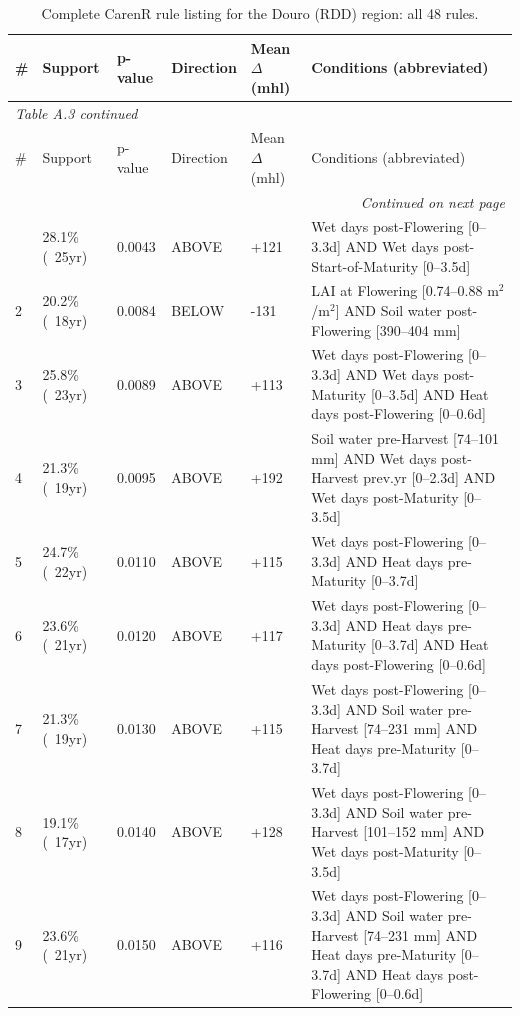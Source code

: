 {\footnotesize
\begin{longtable}{p{0.4cm}|p{1.5cm}|p{1.2cm}|p{1.3cm}|p{1.5cm}|p{8.2cm}}
  \caption{Complete CarenR rule listing for the Douro (RDD) region: all 48 rules.}\label{tab:appa_1}\\
  \toprule
  \# & Support & p-value & Direction & Mean $\Delta$ (mhl) & Conditions (abbreviated) \\
  \midrule
  \endfirsthead
  \multicolumn{6}{l}{\small\textit{Table A.3 continued}}\\
  \toprule
  \# & Support & p-value & Direction & Mean $\Delta$ (mhl) & Conditions (abbreviated) \\
  \midrule
  \endhead
  \midrule
  \multicolumn{6}{r}{\small\textit{Continued on next page}}\\
  \endfoot
  \bottomrule
  \endlastfoot
  1 & 28.1\% (~25yr) & 0.0043 & ABOVE & +121 & Wet days post-Flowering [0--3.3d] AND Wet days post-Start-of-Maturity [0--3.5d] \\
  2 & 20.2\% (~18yr) & 0.0084 & BELOW & -131 & LAI at Flowering [0.74--0.88 m$^2$/m$^2$] AND Soil water post-Flowering [390--404 mm] \\
  3 & 25.8\% (~23yr) & 0.0089 & ABOVE & +113 & Wet days post-Flowering [0--3.3d] AND Wet days post-Maturity [0--3.5d] AND Heat days post-Flowering [0--0.6d] \\
  4 & 21.3\% (~19yr) & 0.0095 & ABOVE & +192 & Soil water pre-Harvest [74--101 mm] AND Wet days post-Harvest prev.yr [0--2.3d] AND Wet days post-Maturity [0--3.5d] \\
  5 & 24.7\% (~22yr) & 0.0110 & ABOVE & +115 & Wet days post-Flowering [0--3.3d] AND Heat days pre-Maturity [0--3.7d] \\
  6 & 23.6\% (~21yr) & 0.0120 & ABOVE & +117 & Wet days post-Flowering [0--3.3d] AND Heat days pre-Maturity [0--3.7d] AND Heat days post-Flowering [0--0.6d] \\
  7 & 21.3\% (~19yr) & 0.0130 & ABOVE & +115 & Wet days post-Flowering [0--3.3d] AND Soil water pre-Harvest [74--231 mm] AND Heat days pre-Maturity [0--3.7d] \\
  8 & 19.1\% (~17yr) & 0.0140 & ABOVE & +128 & Wet days post-Flowering [0--3.3d] AND Soil water pre-Harvest [101--152 mm] AND Wet days post-Maturity [0--3.5d] \\
  9 & 23.6\% (~21yr) & 0.0150 & ABOVE & +116 & Wet days post-Flowering [0--3.3d] AND Soil water pre-Harvest [74--231 mm] AND Heat days pre-Maturity [0--3.7d] AND Heat days post-Flowering [0--0.6d] \\

\end{longtable}}
